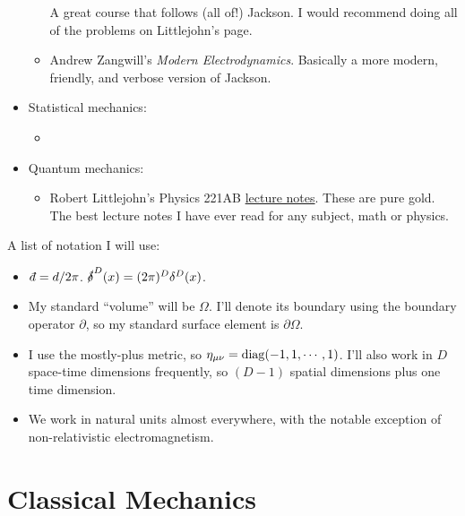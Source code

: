\documentclass[11pt]{article}
\begin{document}
\begin{itemize}
\begin{itemize}
        A great course that follows (all of!) Jackson. I would recommend 
        doing all of the problems on Littlejohn's page.
        \item Andrew Zangwill's \emph{Modern Electrodynamics}. Basically a more 
        modern, friendly, and verbose version of Jackson.
    \end{itemize}
    \item Statistical mechanics:
    \begin{itemize}
        \item {}
    \end{itemize}
    \item Quantum mechanics:
    \begin{itemize}
        \item Robert Littlejohn's Physics 221AB \href{https://bohr.physics.berkeley.edu/classes/221/2122/221.html}{lecture notes}.
        These are pure gold. The best lecture notes I have ever read for any subject,
        math or physics.
    \end{itemize}
\end{itemize}

\begin{reemark}
    A list of notation I will use:
    \begin{itemize}
        \item $\dbar = d/2\pi$. $\sl{\delta}^D(x) = (2\pi)^D \delta^D(x)$.
        \item My standard ``volume'' will be $\Omega$. I'll denote its boundary
        using the boundary operator $\partial$, so my standard surface element
        is $\partial \Omega$.
        \item I use the mostly-plus metric, so $\eta_{\mu \nu} = \diag(-1, 1, \cdots, 1)$.
        I'll also work in $D$ space-time dimensions frequently, so $(D - 1)$
        spatial dimensions plus one time dimension.
        \item We work in natural units almost everywhere, with the notable exception
        of non-relativistic electromagnetism.
    \end{itemize}
\end{reemark}

\newpage
\microtoc
\newpage

\section{Classical Mechanics}
\end{document}
